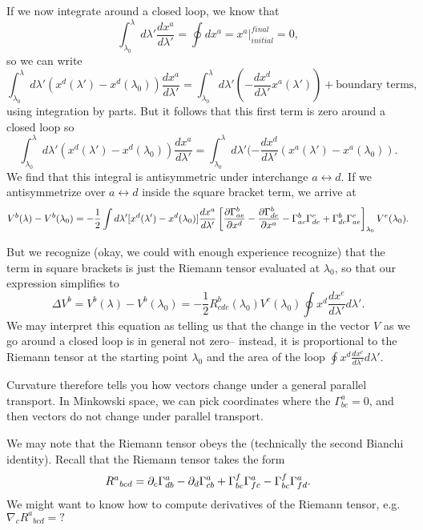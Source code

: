 If we now integrate around a closed loop, we know that
$$\int_{\lambda_0}^\lambda d\lambda' \frac{dx^a}{d\lambda'}=\oint dx^a = x^a|_{initial}^{final}=0,$$
so we can write
$$\int_{\lambda_0}^\lambda d\lambda'(x^d(\lambda')-x^d(\lambda_0))\frac{dx^a}{d\lambda'}=\int_{\lambda_0}^\lambda d\lambda'\left(-\frac{dx^d}{d\lambda'}x^a(\lambda')\right)+\text{boundary terms},$$
 using integration by parts. But it follows that this first term is zero around a closed loop so
$$\int_{\lambda_0}^\lambda d\lambda'(x^d(\lambda')-x^d(\lambda_0))\frac{dx^a}{d\lambda'}=\int_{\lambda_0}^\lambda d\lambda'(-\frac{dx^d}{d\lambda'}(x^a(\lambda')-x^a(\lambda_0)).$$
We find that this integral is antisymmetric under interchange $a\leftrightarrow d.$ If we antisymmetrize over $a\leftrightarrow d$ inside the square bracket term, we arrive at
$$V^b(\lambda)-V^b(\lambda_0)=
-\frac{1}{2}\int d\lambda' [x^d(\lambda')-x^d(\lambda_0)]\frac{dx^a}{d\lambda'}
\left[\frac{\partial \Gamma^b_{ae}}{\partial x^d}-\frac{\partial \Gamma^b_{de}}{\partial x^a}-\Gamma^b_{ac}\Gamma^c_{de}+\Gamma^b_{dc}\Gamma^c_{ae}\right]_{\lambda_0}V^e(\lambda_0).$$

But we recognize (okay, we could with enough experience recognize) that the term in square brackets is just the Riemann tensor evaluated at $\lambda_0$, so that our expression simplifies to
$$\Delta V^b = V^b(\lambda)-V^b(\lambda_0)=-\frac{1}{2}R^b_{cde}(\lambda_0)V^c(\lambda_0)\oint x^d \frac{dx^e}{d\lambda'}d\lambda'.$$
We may interpret this equation as telling us that the change in the vector $V$ as we go around a closed loop is in general not zero-- instead, it is proportional to the Riemann tensor at the starting point $\lambda_0$ and the area of the loop $\oint x^d \frac{dx^e}{d\lambda'}d\lambda'.$

Curvature therefore tells you how vectors change under a general parallel transport. In Minkowski space, we can pick coordinates where the $\Gamma^a_{bc}=0$, and then vectors do not change under parallel transport.

We may note that the Riemann tensor obeys the  (technically the second Bianchi identity). Recall that the Riemann tensor takes the form
$$R^a{}_{bcd}=\partial_c \Gamma^a_{db}-\partial_d \Gamma^a_{cb}+\Gamma^f_{bc} \Gamma^a_{fc}-\Gamma^f_{bc}\Gamma^a_{fd}.$$
We might want to know how to compute derivatives of the Riemann tensor, e.g. $\nabla_c R^a{}_{bcd}=?$

